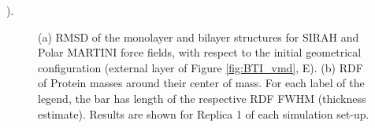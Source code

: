 ).
%
\begin{figure}[h!]
    \caption[Comparison of monolayer and bilayer structural properties]{(a) RMSD of the monolayer and bilayer structures for SIRAH and Polar MARTINI force fields, with respect to the initial geometrical configuration (external layer of Figure \ref{fig:BTI_vmd}, E). (b) RDF of Protein masses around their center of mass. For each label of the legend, the bar has length of the respective RDF FWHM (thickness estimate). Results are shown for Replica 1 of each simulation set-up.}
\label{fig:mono_bi}
\end{figure}

